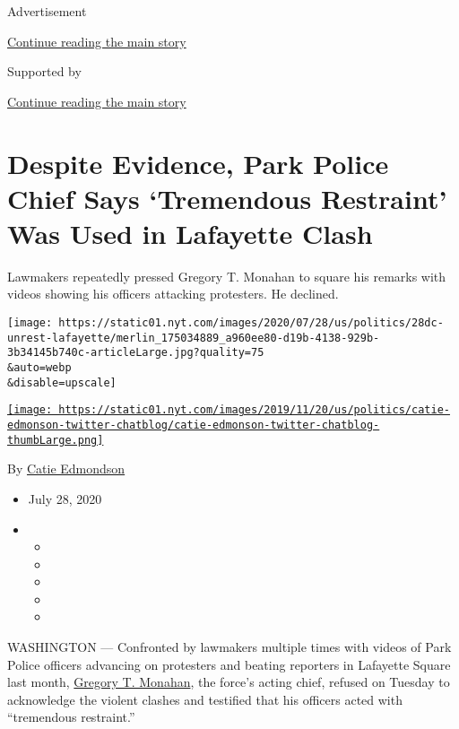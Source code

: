 Advertisement

\protect\hyperlink{after-top}{Continue reading the main story}

Supported by

\protect\hyperlink{after-sponsor}{Continue reading the main story}

\hypertarget{despite-evidence-park-police-chief-says-tremendous-restraint-was-used-in-lafayette-clash}{%
\section{Despite Evidence, Park Police Chief Says `Tremendous Restraint'
Was Used in Lafayette
Clash}\label{despite-evidence-park-police-chief-says-tremendous-restraint-was-used-in-lafayette-clash}}

Lawmakers repeatedly pressed Gregory T. Monahan to square his remarks
with videos showing his officers attacking protesters. He declined.

\texttt{[image: https://static01.nyt.com/images/2020/07/28/us/politics/28dc-unrest-lafayette/merlin\_175034889\_a960ee80-d19b-4138-929b-3b34145b740c-articleLarge.jpg?quality=75\\\&auto=webp\\\&disable=upscale]}

\href{https://www.nytimes.com/by/catie-edmondson}{\texttt{[image: https://static01.nyt.com/images/2019/11/20/us/politics/catie-edmonson-twitter-chatblog/catie-edmonson-twitter-chatblog-thumbLarge.png]}}

By \href{https://www.nytimes.com/by/catie-edmondson}{Catie Edmondson}

\begin{itemize}
\item
  July 28, 2020
\item
  \begin{itemize}
  \item
  \item
  \item
  \item
  \item
  \end{itemize}
\end{itemize}

WASHINGTON --- Confronted by lawmakers multiple times with videos of
Park Police officers advancing on protesters and beating reporters in
Lafayette Square last month,
\href{https://www.nytimes.com/2020/06/18/us/politics/park-police-gregory-monahan.html}{Gregory
T. Monahan}, the force's acting chief, refused on Tuesday to acknowledge
the violent clashes and testified that his officers acted with
``tremendous restraint.''

